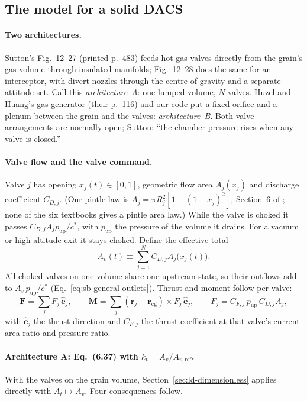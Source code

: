 \subsection{The model for a solid DACS}
\label{sec:ld-dacs}
\paragraph{Two architectures.} Sutton's Fig.~12--27 (printed p.~483)
feeds hot-gas valves directly from the grain's gas volume through
insulated manifolds; Fig.~12--28 does the same for an interceptor, with
divert nozzles through the centre of gravity and a separate attitude
set. Call this \emph{architecture~A}: one lumped volume, $N$ valves.
Huzel and Huang's gas generator (their p.~116) and our code put a
fixed orifice and a plenum between the grain and the valves:
\emph{architecture~B}. Both valve arrangements are normally open;
Sutton: ``the chamber pressure rises when any valve is closed.''

\paragraph{Valve flow and the valve command.} Valve $j$ has opening
$x_j(t)\in[0,1]$, geometric flow area $A_j(x_j)$ and discharge
coefficient $C_{D,j}$. (Our pintle law is
$A_j=\pi R_j^2[1-(1-x_j)^2]$, Section~6 of
; none of the six textbooks gives a pintle area law.) While
the valve is choked it passes $C_{D,j}A_jp_{\mathrm{up}}/c^*$, with
$p_{\mathrm{up}}$ the pressure of the volume it drains. For a vacuum
or high-altitude exit it stays choked. Define the effective total
\[
 A_v(t)\equiv\sum_{j=1}^{N}C_{D,j}A_j\bigl(x_j(t)\bigr).
\]
All choked valves on one volume share one upstream state, so their
outflows add to $A_v\,p_{\mathrm{up}}/c^*$ (Eq.~\eqref{eq:sb-general-outlets}).
Thrust and moment follow per valve:
\[
 \mathbf F=\sum_jF_j\,\hat{\mathbf e}_j,\qquad
 \mathbf M=\sum_j(\mathbf r_j-\mathbf r_{\mathrm{cg}})\times
           F_j\,\hat{\mathbf e}_j,\qquad
 F_j=C_{F,j}\,p_{\mathrm{up}}\,C_{D,j}A_j ,
\]
with $\hat{\mathbf e}_j$ the thrust direction and $C_{F,j}$ the
thrust coefficient at that valve's current area ratio and pressure
ratio.

\paragraph{Architecture A: Eq.~(6.37) with $k_t=A_v/A_{v,\mathrm{ref}}$.}
With the valves on the grain volume, Section~\ref{sec:ld-dimensionless}
applies directly with $A_t\mapsto A_v$. Four consequences follow.

